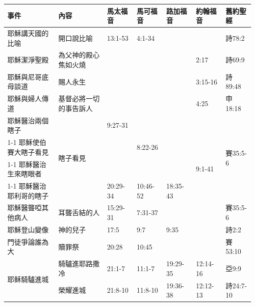 \begin{table}[htbp]
  \centering
    \begin{tabular}{|p{11.72em}|p{7.11em}|p{4.445em}|p{5.39em}|l|l|p{4.39em}|}
    \toprule
        \multicolumn{1}{|l|}{\textbf{事件}} & \multicolumn{1}{l|}{\textbf{內容}} & \multicolumn{1}{l|}{\textbf{馬太福音}} & \multicolumn{1}{l|}{\textbf{馬可福音}} & \multicolumn{1}{l|}{\textbf{路加福音}} & \multicolumn{1}{l|}{\textbf{約翰福音}} &   \multicolumn{1}{l|}{\textbf{舊約聖經}} \\
    \midrule
    耶穌講天國的比喻 & 開口說比喻 &  13:1-53 &  4:1-34 &    &    & 詩78:2 \\
      \midrule
    耶穌潔淨聖殿 & 為父神的殿心焦如火燒 &  & \multicolumn{1}{r|}{} &       &   2:17     & 詩69:9 \\
    \midrule
    耶穌與尼哥底母談道 & 賜人永生  &   & \multicolumn{1}{r|}{} &       &     3:15-16   & 詩89:48 \\
    \midrule
    耶穌與婦人傳道 & 基督必將一切的事告訴人 &  & \multicolumn{1}{r|}{} &       &    4:25    & 申18:18 \\
 
    \midrule
    耶穌醫治兩個瞎子 & \multirow{4}[8]{*}{瞎子看見} &  9:27-31 & \multicolumn{1}{r|}{} &       &       & \multirow{4}[8]{*}{賽35:5-6} \\
\cmidrule{1-1}\cmidrule{3-6}    耶穌使伯賽大瞎子看見 & \multicolumn{1}{r|}{} &       &  8:22-26 &       &       & \multicolumn{1}{c|}{} \\
\cmidrule{1-1}\cmidrule{3-6}    耶穌醫治生來瞎眼者 & \multicolumn{1}{r|}{} &       & \multicolumn{1}{r|}{} &       & \multicolumn{1}{p{4.055em}|}{ 9:1-41} & \multicolumn{1}{c|}{} \\
\cmidrule{1-1}\cmidrule{3-6}    耶穌醫治耶利哥的瞎子 & \multicolumn{1}{r|}{} &  20:29-34 &  10:46-52 & \multicolumn{1}{p{4.165em}|}{ 18:35-43} & \multicolumn{1}{p{4.055em}|}{ } & \multicolumn{1}{c|}{} \\
    \midrule
    耶穌醫聾啞其他病人 &  耳聾舌結的人 & 15:29-31 &  7:31-37 &       &       & 賽35:5-6 \\
    \midrule
    耶穌登山變像 & 神的兒子  &  17:5 &  9:7  & \multicolumn{1}{p{4.165em}|}{ 9:35} &       & \multicolumn{1}{l|}{詩2:2} \\
    \midrule
    門徒爭論誰為大 & 贖罪祭   &  20:28 &  10:45 &       &       & 賽53:10 \\ \midrule
        \multirow{2}{*}{耶稣騎驢進城} & 騎驢進耶路撒冷 &  21:1-7 &  11:1-7 &  19:29-35 & \multicolumn{1}{p{4.055em}|}{ 12:14-16} & 亞9:9 \\
\cmidrule{2-7}    \multicolumn{1}{|r|}{} & 榮耀進城  &  21:8-10 &  11:8-10 &  19:36-38 & \multicolumn{1}{p{4.055em}|}{ 12:12-13} & 詩24:7-10 \\
    \midrule
 

\end{tabular}
\end{table}
